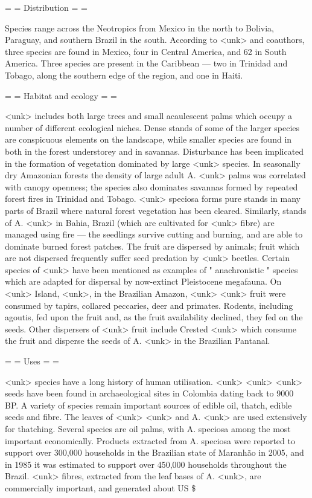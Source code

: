= = Distribution = = 

Species range across the Neotropics from Mexico in the north to Bolivia, Paraguay, and southern Brazil in the south. According to <unk> and coauthors, three species are found in Mexico, four in Central America, and 62 in South America. Three species are present in the Caribbean — two in Trinidad and Tobago, along the southern edge of the region, and one in Haiti. 

= = Habitat and ecology = = 

<unk> includes both large trees and small acaulescent palms which occupy a number of different ecological niches. Dense stands of some of the larger species are conspicuous elements on the landscape, while smaller species are found in both in the forest understorey and in savannas. 
Disturbance has been implicated in the formation of vegetation dominated by large <unk> species. In seasonally dry Amazonian forests the density of large adult A. <unk> palms was correlated with canopy openness; the species also dominates savannas formed by repeated forest fires in Trinidad and Tobago. <unk> speciosa forms pure stands in many parts of Brazil where natural forest vegetation has been cleared. Similarly, stands of A. <unk> in Bahia, Brazil (which are cultivated for <unk> fibre) are managed using fire — the seedlings survive cutting and burning, and are able to dominate burned forest patches. 
The fruit are dispersed by animals; fruit which are not dispersed frequently suffer seed predation by <unk> beetles. Certain species of <unk> have been mentioned as examples of " anachronistic " species which are adapted for dispersal by now-extinct Pleistocene megafauna. On <unk> Island, <unk>, in the Brazilian Amazon, <unk> <unk> fruit were consumed by tapirs, collared peccaries, deer and primates. Rodents, including agoutis, fed upon the fruit and, as the fruit availability declined, they fed on the seeds. Other dispersers of <unk> fruit include Crested <unk> which consume the fruit and disperse the seeds of A. <unk> in the Brazilian Pantanal. 

= = Uses = = 

<unk> species have a long history of human utilisation. <unk> <unk> <unk> seeds have been found in archaeological sites in Colombia dating back to 9000 BP. A variety of species remain important sources of edible oil, thatch, edible seeds and fibre. The leaves of <unk> <unk> and A. <unk> are used extensively for thatching. Several species are oil palms, with A. speciosa among the most important economically. Products extracted from A. speciosa were reported to support over 300,000 households in the Brazilian state of Maranhão in 2005, and in 1985 it was estimated to support over 450,000 households throughout the Brazil. <unk> fibres, extracted from the leaf bases of A. <unk>, are commercially important, and generated about US \$